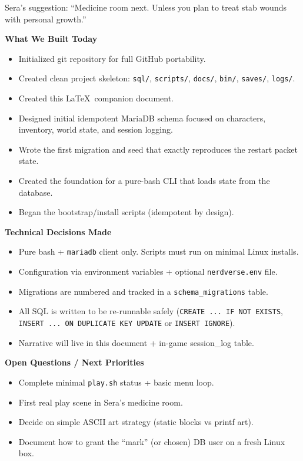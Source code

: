 \documentclass[11pt,a4paper]{article}
\begin{document}
Sera's suggestion: ``Medicine room next. Unless you plan to treat stab wounds with personal growth.''

\textbf{What We Built Today}
\begin{itemize}
  \item Initialized git repository for full GitHub portability.
  \item Created clean project skeleton: \texttt{sql/}, \texttt{scripts/}, \texttt{docs/}, \texttt{bin/}, \texttt{saves/}, \texttt{logs/}.
  \item Created this \LaTeX\ companion document.
  \item Designed initial idempotent MariaDB schema focused on characters, inventory, world state, and session logging.
  \item Wrote the first migration and seed that exactly reproduces the restart packet state.
  \item Created the foundation for a pure-bash CLI that loads state from the database.
  \item Began the bootstrap/install scripts (idempotent by design).
\end{itemize}

\textbf{Technical Decisions Made}
\begin{itemize}
  \item Pure bash + \texttt{mariadb} client only. Scripts must run on minimal Linux installs.
  \item Configuration via environment variables + optional \texttt{nerdverse.env} file.
  \item Migrations are numbered and tracked in a \texttt{schema\_migrations} table.
  \item All SQL is written to be re-runnable safely (\texttt{CREATE ... IF NOT EXISTS}, \texttt{INSERT ... ON DUPLICATE KEY UPDATE} or \texttt{INSERT IGNORE}).
  \item Narrative will live in this document + in-game session\_log table.
\end{itemize}

\textbf{Open Questions / Next Priorities}
\begin{itemize}
  \item Complete minimal \texttt{play.sh} status + basic menu loop.
  \item First real play scene in Sera's medicine room.
  \item Decide on simple ASCII art strategy (static blocks vs printf art).
  \item Document how to grant the ``mark'' (or chosen) DB user on a fresh Linux box.
\end{itemize}
\end{document}
